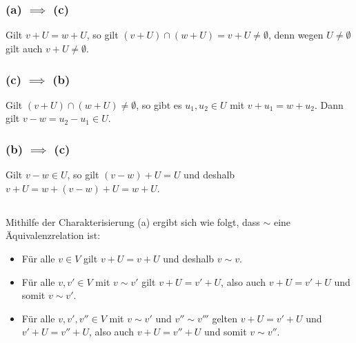 \section{}





\subsection{}

\subsubsection*{(a) $\implies$ (c)}
Gilt $v + U = w + U$, so gilt $(v + U) \cap (w + U) = v + U \neq \emptyset$, denn wegen $U \neq \emptyset$ gilt auch $v + U \neq \emptyset$.

\subsubsection*{(c) $\implies$ (b)}
Gilt $(v + U) \cap (w + U) \neq \emptyset$, so gibt es $u_1, u_2 \in U$ mit $v + u_1 = w + u_2$.
Dann gilt $v - w = u_2 - u_1 \in U$.

\subsubsection*{(b) $\implies$ (c)}
Gilt $v - w \in U$, so gilt $(v - w) + U = U$ und deshalb $v + U = w + (v-w) + U = w + U$.





\subsection{}

Mithilfe der Charakterisierung (a) ergibt sich wie folgt, dass $\sim$ eine Äquivalenzrelation ist:

\begin{itemize}
  \item
    Für alle $v \in V$ gilt $v + U = v + U$ und deshalb $v \sim v$.
  \item
    Für alle $v, v' \in V$ mit $v \sim v'$ gilt $v + U = v' + U$, also auch $v + U = v' + U$ und somit $v \sim v'$.
  \item
    Für alle $v, v', v'' \in V$ mit $v \sim v'$ und $v'' \sim v'''$ gelten $v + U = v' + U$ und $v' + U = v'' + U$, also auch $v + U = v'' + U$ und somit $v \sim v''$.
\end{itemize}

